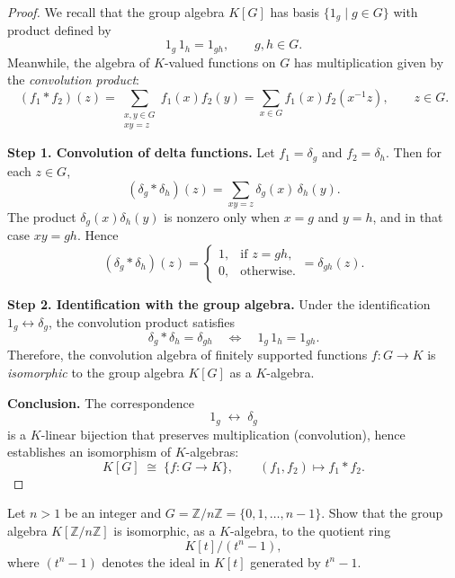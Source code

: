 \begin{proof}
We recall that the group algebra $K[G]$ has basis $\{1_g\mid g\in G\}$ with product defined by
\[
1_g\,1_h = 1_{gh}, \qquad g,h\in G.
\]
Meanwhile, the algebra of $K$-valued functions on $G$ has multiplication given by the
\emph{convolution product}:
\[
(f_1 * f_2)(z)
   = \sum_{\substack{x,y\in G\\ xy=z}} f_1(x)f_2(y)
   = \sum_{x\in G} f_1(x)f_2(x^{-1}z),
   \qquad z\in G.
\]

\smallskip
\noindent
\textbf{Step 1. Convolution of delta functions.}
Let $f_1=\delta_g$ and $f_2=\delta_h$.
Then for each $z\in G$,
\[
(\delta_g*\delta_h)(z)
   = \sum_{xy=z}\delta_g(x)\,\delta_h(y).
\]
The product $\delta_g(x)\delta_h(y)$ is nonzero only when $x=g$ and $y=h$,
and in that case $xy=gh$.
Hence
\[
(\delta_g*\delta_h)(z)
   =
   \begin{cases}
      1, & \text{if } z=gh,\\[4pt]
      0, & \text{otherwise.}
   \end{cases}
   = \delta_{gh}(z).
\]

\smallskip
\noindent
\textbf{Step 2. Identification with the group algebra.}
Under the identification $1_g\leftrightarrow \delta_g$, the convolution product satisfies
\[
\delta_g*\delta_h = \delta_{gh}
\quad\Longleftrightarrow\quad
1_g\,1_h = 1_{gh}.
\]
Therefore, the convolution algebra of finitely supported functions $f:G\to K$
is \emph{isomorphic} to the group algebra $K[G]$ as a $K$-algebra.

\smallskip
\noindent
\textbf{Conclusion.}
The correspondence
\[
1_g \;\longleftrightarrow\; \delta_g
\]
is a $K$-linear bijection that preserves multiplication (convolution),
hence establishes an isomorphism of $K$-algebras:
\[
K[G] \;\cong\;
\bigl\{f:G\to K\bigr\}, \qquad
(f_1,f_2)\longmapsto f_1*f_2.
\]
\end{proof}

\begin{exercise}[1.1.16]\label{ex:1.1.16}
Let $n>1$ be an integer and $G=\mathbb{Z}/n\mathbb{Z}=\{0,1,\dots,n-1\}$.
Show that the group algebra $K[\mathbb{Z}/n\mathbb{Z}]$ is isomorphic, as a $K$-algebra, to the quotient ring
\[
K[t]/(t^n-1),
\]
where $(t^n-1)$ denotes the ideal in $K[t]$ generated by $t^n-1$.
\end{exercise}

